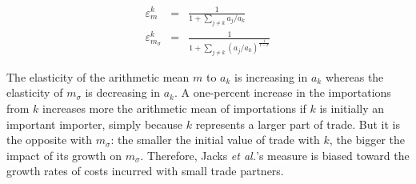 \documentclass{article}
\begin{document}
\begin{eqnarray*}
\varepsilon_m^k&=& \frac{1}{1+\sum\limits_{j \neq k} a_j/a_k}\\
\varepsilon_{m_{\sigma}}^k&=&\frac{1}{1+\sum\limits_{j\neq k} (a_j/a_k)^{\frac{1}{1-\sigma}}}
\end{eqnarray*}

The elasticity of the arithmetic mean $m$ to $a_k$ is
increasing in $a_k$ whereas the elasticity of $m_{\sigma}$ is
decreasing in $a_k$. A one-percent increase in the importations
from $k$ increases more the arithmetic mean of importations if
$k$ is initially an important importer, simply because $k$
represents a larger part of trade. But it is the opposite with
$m_{\sigma}$: the smaller the initial value of trade with $k$,
the bigger the impact of its growth on $m_{\sigma}$. Therefore,
Jacks \textit{et al.}'s measure is biased toward the growth rates of
costs incurred with small trade partners.



\end{document}
